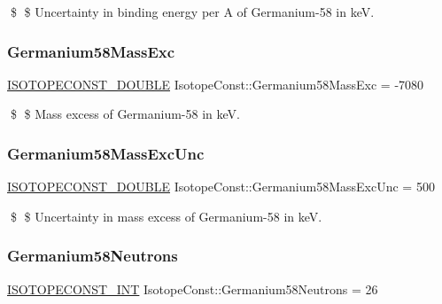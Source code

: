 \$ \$ Uncertainty in binding energy per A of Germanium-\/58 in keV. \mbox{\label{group___isotope_const-_germanium-_ge58_ga70344290a3a645ab10902e7e7f6fd9c1}} 
\subsubsection{\texorpdfstring{Germanium58\+Mass\+Exc}{Germanium58MassExc}}
{\footnotesize\ttfamily \mbox{\hyperlink{group___isotope_const-_macros_ga8f45a7272ce02c0b4c65c44636ed719a}{I\+S\+O\+T\+O\+P\+E\+C\+O\+N\+S\+T\+\_\+\+D\+O\+U\+B\+LE}} Isotope\+Const\+::\+Germanium58\+Mass\+Exc = -\/7080}

\$ \$ Mass excess of Germanium-\/58 in keV. \mbox{\label{group___isotope_const-_germanium-_ge58_ga5ef145a1a9694b8e3b9fecf6adb2e140}} 
\subsubsection{\texorpdfstring{Germanium58\+Mass\+Exc\+Unc}{Germanium58MassExcUnc}}
{\footnotesize\ttfamily \mbox{\hyperlink{group___isotope_const-_macros_ga8f45a7272ce02c0b4c65c44636ed719a}{I\+S\+O\+T\+O\+P\+E\+C\+O\+N\+S\+T\+\_\+\+D\+O\+U\+B\+LE}} Isotope\+Const\+::\+Germanium58\+Mass\+Exc\+Unc = 500}

\$ \$ Uncertainty in mass excess of Germanium-\/58 in keV. \mbox{\label{group___isotope_const-_germanium-_ge58_gab30d56beed14cf064d7c23633597a8b0}} 
\subsubsection{\texorpdfstring{Germanium58\+Neutrons}{Germanium58Neutrons}}
{\footnotesize\ttfamily \mbox{\hyperlink{group___isotope_const-_macros_ga5f18360b3e99483a35c32d789e62621c}{I\+S\+O\+T\+O\+P\+E\+C\+O\+N\+S\+T\+\_\+\+I\+NT}} Isotope\+Const\+::\+Germanium58\+Neutrons = 26}


